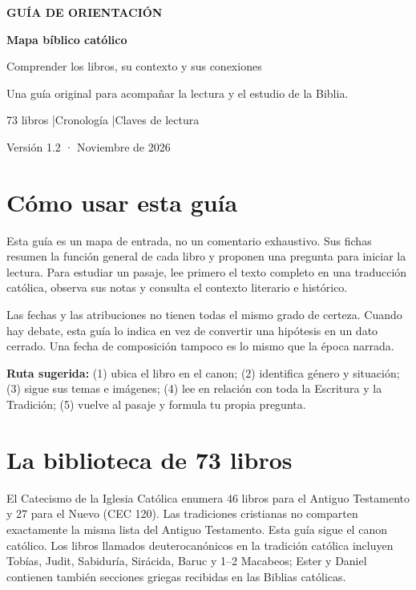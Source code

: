 \documentclass[11pt]{article}
\begin{document}
\begin{titlepage}
\pagecolor{forest}\color{white}
\vspace*{2.7cm}
{\large\color{gold}\textbf{GUÍA DE ORIENTACIÓN}}\par
\vspace{1cm}
{\Huge\bfseries Mapa bíblico católico}\par
\vspace{.7cm}
{\LARGE Comprender los libros, su contexto y sus conexiones}\par
\vspace{1.6cm}
{\large Una guía original para acompañar la lectura y el estudio de la Biblia.}\par
\vfill
{\large 73 libros \quad|\quad Cronología \quad|\quad Claves de lectura}\par
\vspace{.7cm}
{\small Versión 1.2 · Noviembre de 2026}\par
\end{titlepage}
\nopagecolor\color{black}
\section*{Cómo usar esta guía}
Esta guía es un mapa de entrada, no un comentario exhaustivo. Sus fichas resumen la función general de cada libro y proponen una pregunta para iniciar la lectura. Para estudiar un pasaje, lee primero el texto completo en una traducción católica, observa sus notas y consulta el contexto literario e histórico.

Las fechas y las atribuciones no tienen todas el mismo grado de certeza. Cuando hay debate, esta guía lo indica en vez de convertir una hipótesis en un dato cerrado. Una fecha de composición tampoco es lo mismo que la época narrada.

\textbf{Ruta sugerida:} (1) ubica el libro en el canon; (2) identifica género y situación; (3) sigue sus temas e imágenes; (4) lee en relación con toda la Escritura y la Tradición; (5) vuelve al pasaje y formula tu propia pregunta.

\section{La biblioteca de 73 libros}
El Catecismo de la Iglesia Católica enumera 46 libros para el Antiguo Testamento y 27 para el Nuevo (CEC 120). Las tradiciones cristianas no comparten exactamente la misma lista del Antiguo Testamento. Esta guía sigue el canon católico. Los libros llamados deuterocanónicos en la tradición católica incluyen Tobías, Judit, Sabiduría, Sirácida, Baruc y 1--2 Macabeos; Ester y Daniel contienen también secciones griegas recibidas en las Biblias católicas.
\end{document}
